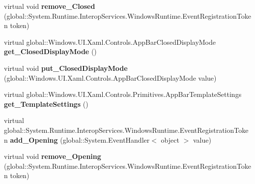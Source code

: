 \begin{DoxyCompactItemize}
\item 
\mbox{\label{class_windows_1_1_u_i_1_1_xaml_1_1_controls_1_1_app_bar_a3ae78268589fb871f3fba9dbb13e32b4}} 
virtual void {\bfseries remove\+\_\+\+Closed} (global\+::\+System.\+Runtime.\+Interop\+Services.\+Windows\+Runtime.\+Event\+Registration\+Token token)
\item 
\mbox{\label{class_windows_1_1_u_i_1_1_xaml_1_1_controls_1_1_app_bar_a46d37ed2b539c5c23c95c2f3d1bbe080}} 
virtual global\+::\+Windows.\+U\+I.\+Xaml.\+Controls.\+App\+Bar\+Closed\+Display\+Mode {\bfseries get\+\_\+\+Closed\+Display\+Mode} ()
\item 
\mbox{\label{class_windows_1_1_u_i_1_1_xaml_1_1_controls_1_1_app_bar_a1a13c7a737fd9dc3411f69e637231233}} 
virtual void {\bfseries put\+\_\+\+Closed\+Display\+Mode} (global\+::\+Windows.\+U\+I.\+Xaml.\+Controls.\+App\+Bar\+Closed\+Display\+Mode value)
\item 
\mbox{\label{class_windows_1_1_u_i_1_1_xaml_1_1_controls_1_1_app_bar_a2e23c12e2a789785cc3543b45ad5e974}} 
virtual global\+::\+Windows.\+U\+I.\+Xaml.\+Controls.\+Primitives.\+App\+Bar\+Template\+Settings {\bfseries get\+\_\+\+Template\+Settings} ()
\item 
\mbox{\label{class_windows_1_1_u_i_1_1_xaml_1_1_controls_1_1_app_bar_a355e1e4a38bea8069ad912132936c3e5}} 
virtual global\+::\+System.\+Runtime.\+Interop\+Services.\+Windows\+Runtime.\+Event\+Registration\+Token {\bfseries add\+\_\+\+Opening} (global\+::\+System.\+Event\+Handler$<$ object $>$ value)
\item 
\mbox{\label{class_windows_1_1_u_i_1_1_xaml_1_1_controls_1_1_app_bar_a1912d3027c4521c8dcda380a853d656e}} 
virtual void {\bfseries remove\+\_\+\+Opening} (global\+::\+System.\+Runtime.\+Interop\+Services.\+Windows\+Runtime.\+Event\+Registration\+Token token)
\item 
\mbox{\label{class_windows_1_1_u_i_1_1_xaml_1_1_controls_1_1_app_bar_a669f99f9098da8948468675637292c38}} 

\end{DoxyCompactItemize}
